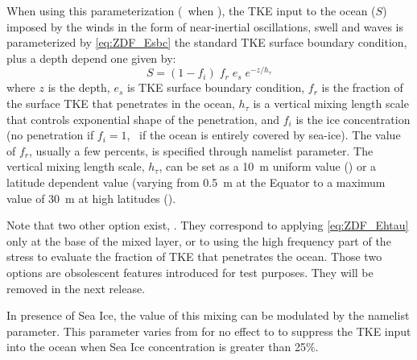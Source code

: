 \documentclass[../main/NEMO_manual]{subfiles}
\begin{document}
When using this parameterization (\ie\ when ),
the TKE input to the ocean ($S$) imposed by the winds in the form of near-inertial oscillations,
swell and waves is parameterized by \autoref{eq:ZDF_Esbc} the standard TKE surface boundary condition,
plus a depth depend one given by:
\begin{equation}
  \label{eq:ZDF_Ehtau}
  S = (1-f_i) \; f_r \; e_s \; e^{-z / h_\tau}
\end{equation}
where $z$ is the depth, $e_s$ is TKE surface boundary condition, $f_r$ is the fraction of the surface TKE that
penetrates in the ocean, $h_\tau$ is a vertical mixing length scale that controls exponential shape of
the penetration, and $f_i$ is the ice concentration
(no penetration if $f_i=1$, \ie\ if the ocean is entirely covered by sea-ice).
The value of $f_r$, usually a few percents, is specified through  namelist parameter.
The vertical mixing length scale, $h_\tau$, can be set as a 10~m uniform value () or
a latitude dependent value (varying from 0.5~m at the Equator to a maximum value of 30~m at high latitudes
().

Note that two other option exist, .
They correspond to applying \autoref{eq:ZDF_Ehtau} only at the base of the mixed layer,
or to using the high frequency part of the stress to evaluate the fraction of TKE that penetrates the ocean.
Those two options are obsolescent features introduced for test purposes.
They will be removed in the next release.

In presence of Sea Ice, the value of this mixing can be modulated by the  namelist parameter.
This parameter varies from  for no effect to  to suppress the TKE input into the ocean when Sea Ice concentration
is greater than 25\%.

\end{document}
